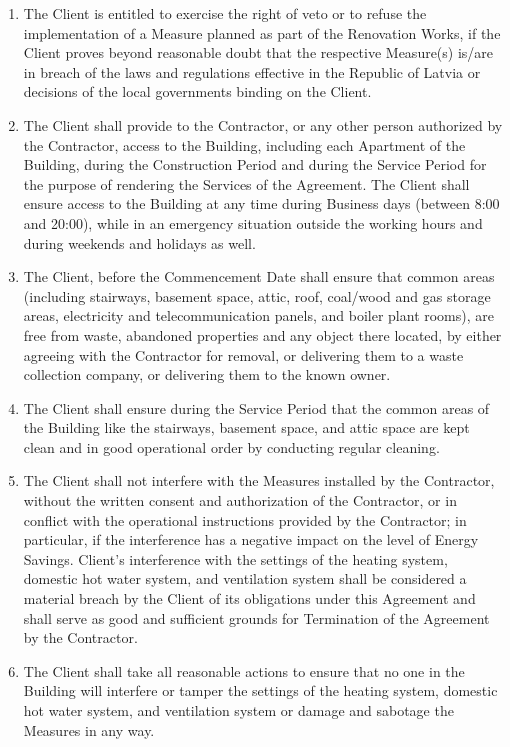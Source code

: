 \begin{multicols}{2}
\begin{enumerate}
	\item The Client is entitled to exercise the right of veto or to refuse the implementation of a Measure planned as part of the Renovation Works, if the Client proves beyond reasonable doubt that the respective Measure(s) is/are in breach of the laws and regulations effective in the Republic of Latvia or decisions of the local governments binding on the Client. 
	\item The Client shall provide to the Contractor, or any other person authorized by the Contractor, access to the Building, including each Apartment of the Building, during the Construction Period and during the Service Period for the purpose of rendering the Services of the Agreement. The Client shall ensure access to the Building at any time during Business days (between 8:00 and 20:00), while in an emergency situation outside the working hours and during weekends and holidays as well. 
	\item The Client, before the Commencement Date shall ensure that common areas (including stairways, basement space, attic, roof, coal/wood and gas storage areas, electricity and telecommunication panels, and boiler plant rooms), are free from waste, abandoned properties and any object there located, by either agreeing with the Contractor for removal, or delivering them to a waste collection company, or delivering them to the known owner. 
	\item The Client shall ensure during the Service Period that the common areas of the Building like the stairways, basement space, and attic space are kept clean and in good operational order by conducting regular cleaning. 
	\item The Client shall not interfere with the Measures installed by the Contractor, without the written consent and authorization of the Contractor, or in conflict with the operational instructions provided by the Contractor; in particular, if the interference has a negative impact on the level of Energy Savings. Client’s interference with the settings of the heating system, domestic hot water system, and ventilation system shall be considered a material breach by the Client of its obligations under this Agreement and shall serve as good and sufficient grounds for Termination of the Agreement by the Contractor. 
	\item The Client shall take all reasonable actions to ensure that no one in the Building will interfere or tamper the settings of the heating system, domestic hot water system, and ventilation system or damage and sabotage the Measures in any way. 

\end{enumerate}
\end{multicols}
